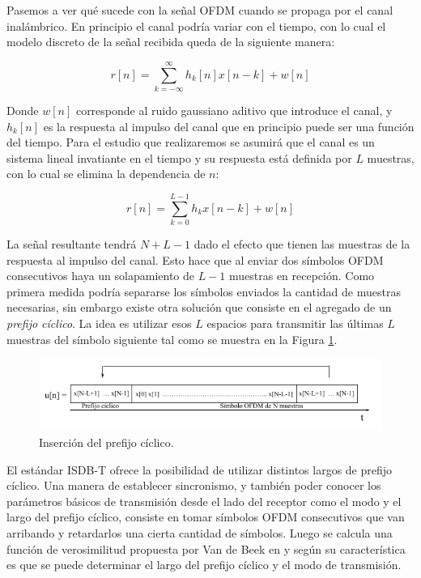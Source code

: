 Pasemos a ver qué sucede con la señal OFDM cuando se propaga por el canal inalámbrico. En principio el canal podría variar con el tiempo, con lo cual el modelo discreto de la señal recibida queda de la siguiente manera:

\begin{equation}
r[n] = \sum_{k = -\infty}^{\infty} h_k[n]x[n-k] + w[n]
\end{equation}

Donde $w[n]$ corresponde al ruido gaussiano aditivo que introduce el canal, y $h_k[n]$ es la respuesta al impulso del canal que en principio puede ser una función del tiempo. Para el estudio que realizaremos se asumirá que el canal es un sistema lineal invatiante en el tiempo y su respuesta está definida por $L$ muestras, con lo cual se elimina la dependencia de $n$:

\begin{equation}
r[n] = \sum_{k = 0}^{L-1} h_k x[n-k] + w[n]
\end{equation}

La señal resultante tendrá $N+L-1$ dado el efecto que tienen las muestras de la respuesta al impulso del canal. Esto hace que al enviar dos símbolos OFDM consecutivos haya un solapamiento de $L-1$ muestras en recepción. Como primera medida podría separarse los símbolos enviados la cantidad de muestras necesarias, sin embargo existe otra solución que consiste en el agregado de un \textit{prefijo cíclico}. La idea es utilizar esos $L$ espacios para transmitir las últimas $L$ muestras del símbolo siguiente tal como se muestra en la Figura \ref{f:prefijo_ciclico}.

\begin{figure}[!h]
\centering
\includegraphics[scale=0.65]{figuras/cap03/prefijo_ciclico}
\caption{\label{f:prefijo_ciclico} Inserción del prefijo cíclico.}
\end{figure}

El estándar ISDB-T ofrece la posibilidad de utilizar distintos largos de prefijo cíclico. Una manera de establecer sincronismo, y también poder conocer los parámetros básicos de transmisión desde el lado del receptor como el modo y el largo del prefijo cíclico, consiste en tomar símbolos OFDM consecutivos que van arribando y retardarlos una cierta cantidad de símbolos. Luego se calcula una función de verosimilitud propuesta por Van de Beek en \cite{van1997ml} y según su característica es que se puede determinar el largo del prefijo cíclico y el modo de transmisión.  

